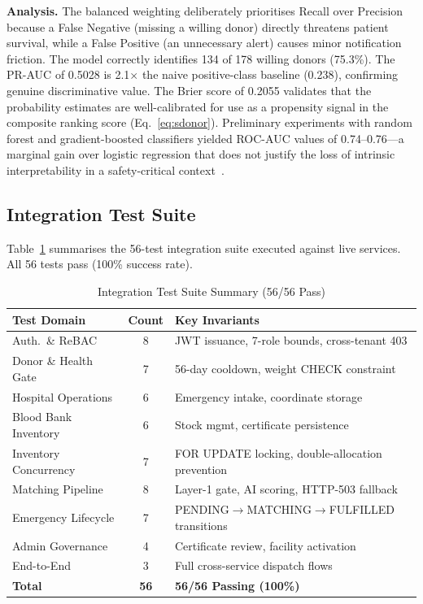 \documentclass[conference]{IEEEtran}
\begin{document}
\textbf{Analysis.} The balanced weighting deliberately prioritises
Recall over Precision because a False Negative (missing a willing
donor) directly threatens patient survival, while a False Positive
(an unnecessary alert) causes minor notification friction. The model
correctly identifies 134 of 178 willing donors (75.3\%). The PR-AUC
of 0.5028 is 2.1$\times$ the naive positive-class baseline (0.238),
confirming genuine discriminative value. The Brier score of 0.2055
validates that the probability estimates are well-calibrated for use
as a propensity signal in the composite ranking score
(Eq.~\ref{eq:sdonor}). Preliminary experiments with random forest and
gradient-boosted classifiers yielded ROC-AUC values of 0.74--0.76---a
marginal gain over logistic regression that does not justify the loss of
intrinsic interpretability in a safety-critical context~\cite{rudin2019}.

\subsection{Integration Test Suite}
Table~\ref{tab:tests} summarises the 56-test integration suite executed
against live services. All 56 tests pass (100\% success rate).

\begin{table}[t]
  \centering
  \caption{Integration Test Suite Summary (56/56 Pass)}
  \label{tab:tests}
  \setlength{\tabcolsep}{3pt}
  \renewcommand{\arraystretch}{1.1}
  \begin{tabular}{@{}lcp{3.3cm}@{}}
    \toprule
    \textbf{Test Domain} & \textbf{Count} & \textbf{Key Invariants} \\
    \midrule
    Auth.\ \& ReBAC        & 8 & JWT issuance, 7-role bounds, cross-tenant 403 \\
    Donor \& Health Gate   & 7 & 56-day cooldown, weight CHECK constraint \\
    Hospital Operations    & 6 & Emergency intake, coordinate storage \\
    Blood Bank Inventory   & 6 & Stock mgmt, certificate persistence \\
    Inventory Concurrency  & 7 & FOR UPDATE locking, double-allocation prevention \\
    Matching Pipeline      & 8 & Layer-1 gate, AI scoring, HTTP-503 fallback \\
    Emergency Lifecycle    & 7 & PENDING$\to$MATCHING$\to$FULFILLED transitions \\
    Admin Governance       & 4 & Certificate review, facility activation \\
    End-to-End             & 3 & Full cross-service dispatch flows \\
    \midrule
    \textbf{Total}         & \textbf{56} & \textbf{56/56 Passing (100\%)} \\
    \bottomrule
  \end{tabular}
\end{table}
\end{document}
